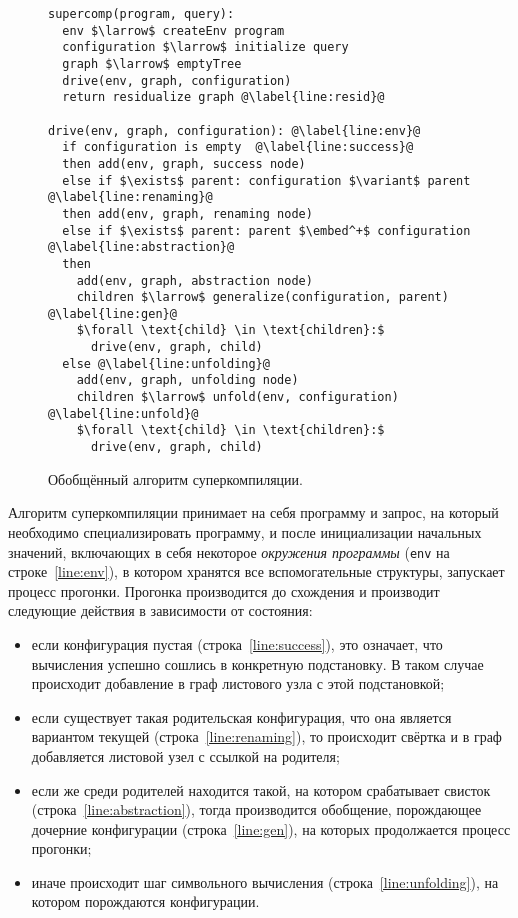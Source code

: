 \begin{figure}[h!]

\begin{lstlisting}[escapechar=@]
supercomp(program, query):
  env $\larrow$ createEnv program
  configuration $\larrow$ initialize query
  graph $\larrow$ emptyTree
  drive(env, graph, configuration)
  return residualize graph @\label{line:resid}@

drive(env, graph, configuration): @\label{line:env}@
  if configuration is empty  @\label{line:success}@
  then add(env, graph, success node)
  else if $\exists$ parent: configuration $\variant$ parent @\label{line:renaming}@
  then add(env, graph, renaming node)
  else if $\exists$ parent: parent $\embed^+$ configuration @\label{line:abstraction}@
  then
    add(env, graph, abstraction node)
    children $\larrow$ generalize(configuration, parent) @\label{line:gen}@
    $\forall \text{child} \in \text{children}:$
      drive(env, graph, child)
  else @\label{line:unfolding}@
    add(env, graph, unfolding node)
    children $\larrow$ unfold(env, configuration) @\label{line:unfold}@
    $\forall \text{child} \in \text{children}:$
      drive(env, graph, child)
\end{lstlisting}
\caption{Обобщённый алгоритм суперкомпиляции.}
\label{fig:scalgogen}
\end{figure}

Алгоритм суперкомпиляции принимает на себя программу и запрос,
на который необходимо специализировать программу, и после
инициализации начальных значений, включающих в себя некоторое
\emph{окружения программы} (\lstinline{env} на строке~\ref{line:env}),
в котором хранятся все вспомогательные структуры, запускает процесс прогонки.
Прогонка производится до схождения и производит следующие действия в
зависимости от состояния:
\begin{itemize}
\item если конфигурация пустая (строка~\ref{line:success}), это означает, что вычисления
      успешно сошлись в конкретную подстановку. В таком случае происходит добавление
      в граф листового узла с этой подстановкой;
\item если существует такая родительская конфигурация, что она является вариантом текущей (строка~\ref{line:renaming}),
      то происходит свёртка и в граф добавляется листовой узел с ссылкой на родителя;
\item если же среди родителей находится такой, на котором срабатывает свисток (строка~\ref{line:abstraction}),
      тогда производится обобщение, порождающее дочерние конфигурации (строка~\ref{line:gen}),
      на которых продолжается процесс прогонки;
\item иначе происходит шаг символьного вычисления (строка~\ref{line:unfolding}), на котором
      порождаются конфигурации.

\end{itemize}

